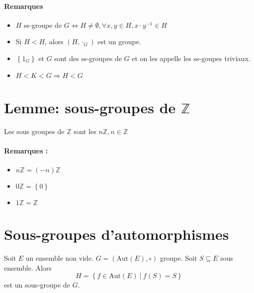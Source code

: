 \documentclass[a4paper,10pt]{report}
\newcommand{\set}[1]{\left\lbrace #1 \right\rbrace } %
\newcommand{\IZ}{\mathbb{Z}} %
\newcommand{\so}{\Rightarrow}
\newcommand{\such}{\ \Big| \ }
\begin{document}
   \paragraph{Remarques}
   \begin{itemize}
     \item $H$ ss-groupe de $G \iff H \ne \emptyset, \forall x,y \in H,
       x \cdot y^{-1} \in H$
     \item Si $H < H$, alors $(H, \cdot_G)$ est un groupe.
     \item $\set{1_G}$ et $G$ sont des ss-groupes de $G$
       et on les appelle les ss-goupes triviaux.
     \item $H < K < G \so H < G$
   \end{itemize}

  \section{Lemme: sous-groupes de $\IZ$}
   Les sous groupes de $\IZ$ sont les $n\IZ, n \in \IZ$
   \paragraph{Remarques :}
   \begin{itemize}
     \item $n\IZ = (-n)\IZ$
     \item $0\IZ = \set{0}$
     \item $1\IZ = \IZ$
   \end{itemize}
   \begin{comment}
     \paragraph{Preuve :} voir CM 19/09/08 p3 recto haut de page.
    \end{comment}
 
  \section{Sous-groupes d'automorphismes}
   Soit $E$ un ensemble non vide. $G=(\mathrm{Aut}(E), \circ)$ groupe. Soit
   $S \subseteq E$ sous ensemble. Alors 
   $$H=\set{f \in \mathrm{Aut}(E) \such f(S)=S}$$
   est un sous-groupe de $G$.
   \begin{comment}
     \paragraph{Preuve :} voir CM 19/09/08 p3 verso bas de page
   \end{comment}
\end{document}

